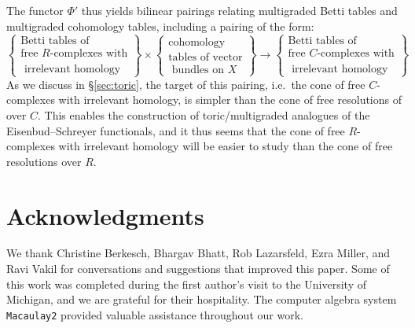 \documentclass[12pt]{amsart}
\theoremstyle{definition}
\theoremstyle{remark}
\begin{document}
The functor $\Phi'$ thus yields bilinear pairings relating multigraded Betti tables and multigraded cohomology tables, including a pairing of the form:
\begin{equation*}%
\label{eqn:multipairing}
%
\left\{\begin{matrix}
\text{Betti tables of} \\ \text{free $R$-complexes with}\\
\text{  irrelevant homology}\end{matrix}\right\}
%
\times 
%
\left\{\begin{matrix}
\text{cohomology }\\
\text{tables of vector}\\
\text{ bundles on } X
\end{matrix}\right\}
%
\longrightarrow
\left\{\begin{matrix}
\text{Betti tables of} \\ \text{free $C$-complexes with}\\
\text{  irrelevant homology}
\end{matrix}\right\}
\end{equation*}
As we discuss in \S\ref{sec:toric}, the target of this pairing, i.e.\ the cone of free $C$-complexes with irrelevant homology, is simpler than the cone of free resolutions of over $C$.  This enables the construction of toric/multigraded analogues of the Eisenbud--Schreyer functionals, and it thus seems that the cone of free $R$-complexes with irrelevant homology will be easier to study than the cone of free resolutions over $R$. 

\section*{Acknowledgments}
We thank Christine Berkesch, Bhargav Bhatt, Rob Lazarsfeld, Ezra Miller, and Ravi Vakil for conversations and suggestions that improved this paper.
Some of this work was completed during the first author's visit to the University of Michigan, and we are grateful for their hospitality.  The computer
algebra system \texttt{Macaulay2} \cite{M2} provided valuable assistance throughout our work.
\end{document}
